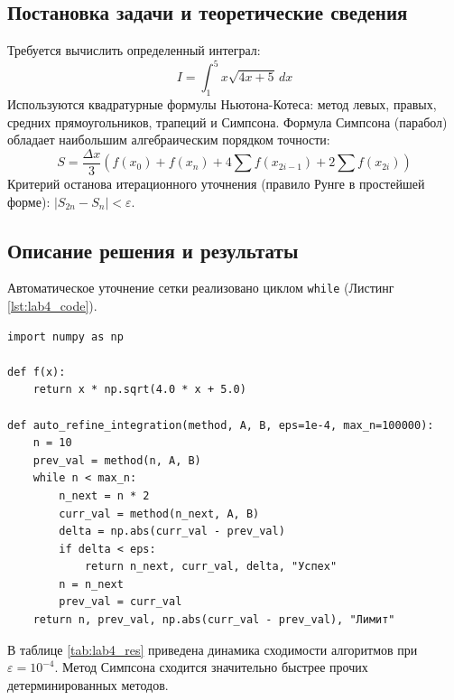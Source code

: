 \documentclass[a4paper,14pt]{extarticle}
\begin{document}
\subsection{Постановка задачи и теоретические сведения}
Требуется вычислить определенный интеграл:
\begin{equation}
    I = \int_{1}^{5} x \sqrt{4x + 5} \, dx
\end{equation}
Используются квадратурные формулы Ньютона-Котеса: метод левых, правых, средних прямоугольников, трапеций и Симпсона. Формула Симпсона (парабол) обладает наибольшим алгебраическим порядком точности:
\begin{equation}
    S = \frac{\Delta x}{3} \left( f(x_0) + f(x_n) + 4\sum f(x_{2i-1}) + 2\sum f(x_{2i}) \right)
\end{equation}
Критерий останова итерационного уточнения (правило Рунге в простейшей форме): $|S_{2n} - S_n| < \varepsilon$.

\subsection{Описание решения и результаты}
Автоматическое уточнение сетки реализовано циклом \texttt{while} (Листинг \ref{lst:lab4_code}).

\begin{lstlisting}[caption={Универсальная функция автоматического уточнения интеграла}, label={lst:lab4_code}]
import numpy as np

def f(x):
    return x * np.sqrt(4.0 * x + 5.0)

def auto_refine_integration(method, A, B, eps=1e-4, max_n=100000):
    n = 10
    prev_val = method(n, A, B)
    while n < max_n:
        n_next = n * 2
        curr_val = method(n_next, A, B)
        delta = np.abs(curr_val - prev_val)
        if delta < eps:
            return n_next, curr_val, delta, "Успех"
        n = n_next
        prev_val = curr_val
    return n, prev_val, np.abs(curr_val - prev_val), "Лимит"
\end{lstlisting}

В таблице \ref{tab:lab4_res} приведена динамика сходимости алгоритмов при $\varepsilon = 10^{-4}$. Метод Симпсона сходится значительно быстрее прочих детерминированных методов.
\end{document}
